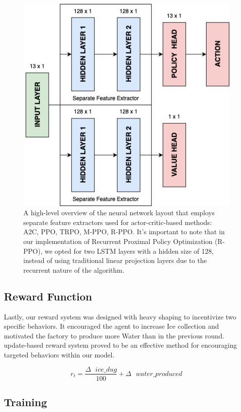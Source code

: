 \begin{figure}[htbp]
    \centering
    \includegraphics[width=0.6\linewidth]{images/methods_singleunit/net/separate_policy.png}
    \captionsetup{justification=justified, singlelinecheck=false, width=1\linewidth, labelfont=bf} 
    \caption[]{A high-level overview of the neural network layout that employs separate feature extractors used for actor-critic-based methods: A2C, PPO, TRPO, M-PPO, R-PPO. It's important to note that in our implementation of Recurrent Proximal Policy Optimization (R-PPO), we opted for two LSTM layers with a hidden size of 128, instead of using traditional linear projection layers due to the recurrent nature of the algorithm.}
    \label{fig:separate-policy}
\end{figure}


\subsection{Reward Function}
\label{subsec:single-reward}

\noindent Lastly, our reward system was designed with heavy shaping to incentivize two specific behaviors. It encouraged the agent to increase Ice collection and motivated the factory to produce more Water than in the previous round.  update-based reward system proved to be an effective method for encouraging targeted behaviors within our model.

\begin{equation}
    r_t = \frac{\Delta \text{ } ice\_dug}{100} + \Delta \text{ } water\_produced
    \label{eq:reward-function}
\end{equation}


\subsection{Training}
\label{sec:single-unit-training}

